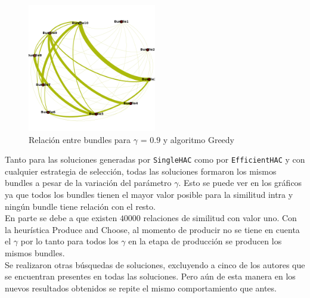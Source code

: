 \begin{figure}[H]
  \centering
    \includegraphics[width=0.5\textwidth]{resultados/authors/intra_inter/greedy09.png}
  \caption{Relación entre bundles para $\gamma$ = $0.9$ y algoritmo Greedy}
  \label{res:img-authors-gamma09-greedy}
\end{figure}

Tanto para las soluciones generadas por \texttt{SingleHAC} como por \texttt{EfficientHAC} y con 
cualquier estrategia de selección, todas las soluciones formaron los mismos bundles a pesar de la 
variación del parámetro $\gamma$. Esto se puede ver en los gráficos ya que todos los bundles 
tienen el mayor valor posible para la similitud intra y ningún bundle tiene relación con el 
resto.\\
En parte se debe a que existen $40000$ relaciones de similitud con valor uno. Con la 
heurística Produce and Choose, al momento de producir no se tiene en cuenta el $\gamma$ por lo tanto 
para todos los $\gamma$ en la etapa de producción se producen los mismos bundles.\\
Se realizaron otras búsquedas de soluciones, excluyendo a cinco de los autores que se encuentran 
presentes en todas las soluciones. Pero aún de esta manera en los nuevos resultados obtenidos se 
repite el mismo comportamiento que antes.

